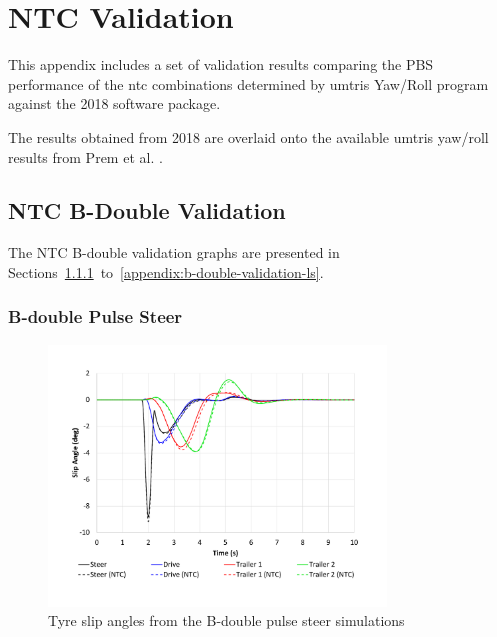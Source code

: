 \chapter{NTC Validation}\label{appendix:NTC-validation}

This appendix includes a set of validation results comparing the PBS performance of the \gls{ntc} combinations determined by \glspl{umtri} Yaw/Roll program against the \trucksim{} 2018 software package.

The results obtained from \trucksim{} 2018 are overlaid onto the available \glspl{umtri} yaw/roll results from Prem et al. \cite{Prem2001}.

\section{NTC B-Double Validation}\label{appendix:NRTC-b-double-validation-results}

The NTC B-double validation graphs are presented in Sections~\ref{appendix:b-double-validation-ps}~to~\ref{appendix:b-double-validation-ls}.

\subsection{B-double Pulse Steer}\label{appendix:b-double-validation-ps}

    \begin{figure}[H]
        \centering
        \includegraphics[width=0.8\textwidth]{fig/ntc-b-double_psa}
        \caption{Tyre slip angles from the B-double pulse steer simulations}
        \label{figure:NRC-B-Double_PSa}
    \end{figure}

